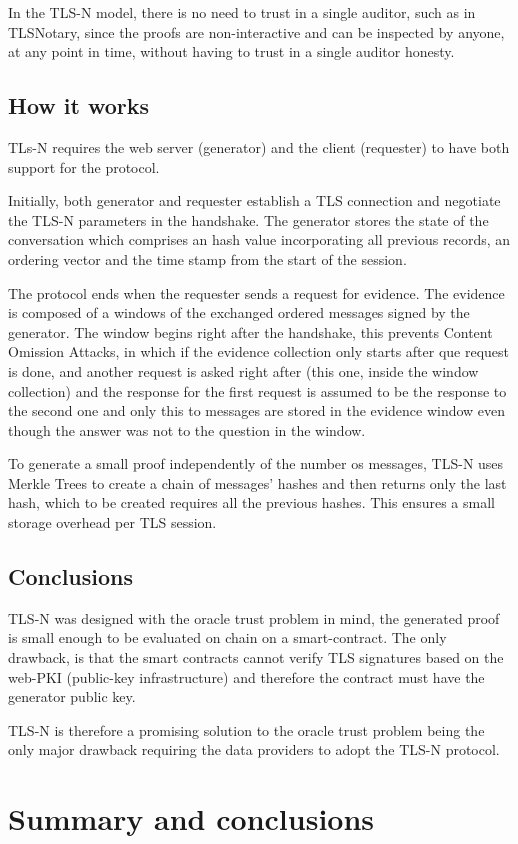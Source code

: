 In the TLS-N model, there is no need to trust in a single auditor, such as in TLSNotary, since the proofs are non-interactive and can be inspected by anyone, at any point in time, without having to trust in a single auditor honesty.


\subsection{How it works}
TLs-N requires the web server (generator) and the client (requester) to have both support for the protocol.

Initially, both generator and requester establish a TLS connection and negotiate the TLS-N parameters in the handshake. The generator stores the state of the conversation which comprises an hash value incorporating all previous records, an ordering vector and the time stamp from the start of the session.

The protocol ends when the requester sends a request for evidence. The evidence is composed of a windows of the exchanged ordered messages signed by the generator. The window begins right after the handshake, this prevents Content Omission Attacks, in which if the evidence collection only starts after que request is done, and another request is asked right after (this one, inside the window collection) and the response for the first request is assumed to be the response to the second one and only this to messages are stored in the evidence window even though the answer was not to the question in the window.

To generate a small proof independently of the number os messages, TLS-N uses Merkle Trees to create a chain of messages' hashes and then returns only the last hash, which to be created requires all the previous hashes. This ensures a small storage overhead per TLS session.


\subsection{Conclusions}
TLS-N was designed with the oracle trust problem in mind, the generated proof is small enough to be evaluated on chain on a smart-contract. The only drawback, is that the smart contracts cannot verify TLS signatures based on the web-PKI (public-key infrastructure) and therefore the contract must have the generator public key.

TLS-N is therefore a promising solution to the oracle trust problem being the only major drawback requiring the data providers to adopt the TLS-N protocol.


\section{Summary and conclusions}
